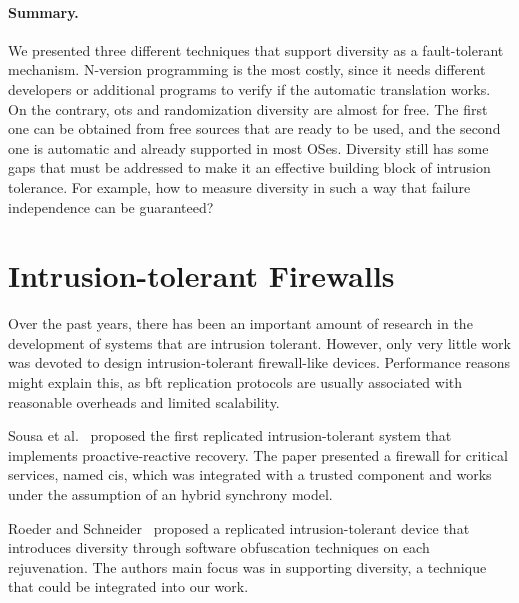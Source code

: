 \paragraph{Summary.}
We presented three different techniques that support diversity as a fault-tolerant mechanism. 
N-version programming is the most costly, since it needs different developers or additional programs to verify if the automatic translation works. 
On the contrary, \gls{ots} and randomization diversity are almost for free. 
The first one can be obtained from free sources that are ready to be used, and the second one is automatic and already supported
in most OSes. 
Diversity still has some gaps that must be addressed to make it an effective building block of intrusion tolerance. 
For example, how to measure diversity in such a way that failure independence can be guaranteed?



\section{Intrusion-tolerant Firewalls}
\label{sec:intrusiontolerantfirewalls}

Over the past years, there has been an important amount of research in the development of systems that are intrusion tolerant.
However, only very little work was devoted to design intrusion-tolerant firewall-like devices. Performance reasons might explain this, as \gls{bft} replication protocols are usually associated with reasonable overheads and limited scalability.

Sousa et al.~\cite{Sousa:2010} proposed the first replicated intrusion-tolerant system that implements proactive-reactive recovery. 
The paper presented a firewall for critical services, named \gls{cis}, which was integrated with a trusted component and works under the assumption of an hybrid synchrony model.


Roeder and Schneider~\cite{Roeder:2010} proposed a replicated intrusion-tolerant device that introduces diversity through software obfuscation techniques on each rejuvenation.
The authors main focus was in supporting diversity, a technique that could be integrated into our work.


